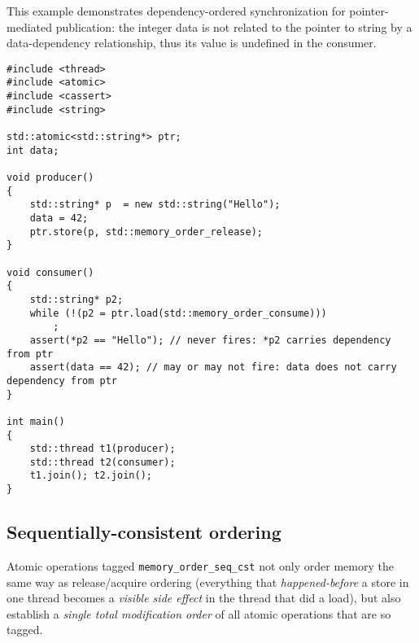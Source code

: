 \documentclass[a4paper,12pt,notitlepage,twoside,openright]{article}
\begin{document}
This example demonstrates dependency-ordered synchronization for
pointer-mediated publication: the integer data is not related to the
pointer to string by a data-dependency relationship, thus its value is
undefined in the consumer.

\begin{verbatim}
#include <thread>
#include <atomic>
#include <cassert>
#include <string>

std::atomic<std::string*> ptr;
int data;

void producer()
{
    std::string* p  = new std::string("Hello");
    data = 42;
    ptr.store(p, std::memory_order_release);
}

void consumer()
{
    std::string* p2;
    while (!(p2 = ptr.load(std::memory_order_consume)))
        ;
    assert(*p2 == "Hello"); // never fires: *p2 carries dependency from ptr
    assert(data == 42); // may or may not fire: data does not carry dependency from ptr
}

int main()
{
    std::thread t1(producer);
    std::thread t2(consumer);
    t1.join(); t2.join();
}
\end{verbatim}

\hypertarget{sequentially-consistent-ordering}{%
\subsection{Sequentially-consistent
ordering}\label{sequentially-consistent-ordering}}

Atomic operations tagged \texttt{memory\_order\_seq\_cst} not only order memory
the same way as release/acquire ordering (everything that
\emph{happened-before} a store in one thread becomes a \emph{visible
side effect} in the thread that did a load), but also establish a
\emph{single total modification order} of all atomic operations that are
so tagged.
\end{document}
